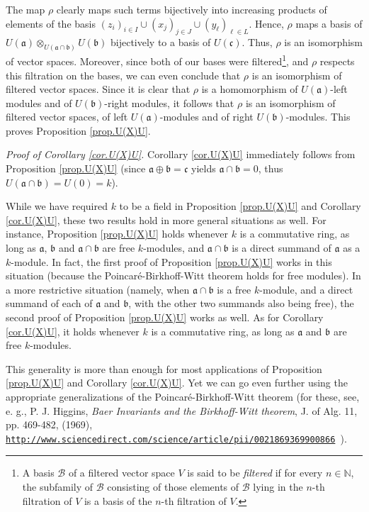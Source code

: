 \documentclass[etingof-lie.tex]{subfiles}
\begin{document}
The map $\rho$ clearly maps such terms bijectively into increasing products of
elements of the basis $\left(  z_{i}\right)  _{i\in I}\cup\left(
x_{j}\right)  _{j\in J}\cup\left(  y_{\ell}\right)  _{\ell\in L}$. Hence,
$\rho$ maps a basis of $U\left(  \mathfrak{a}\right)  \otimes_{U\left(
\mathfrak{a}\cap\mathfrak{b}\right)  }U\left(  \mathfrak{b}\right)  $
bijectively to a basis of $U\left(  \mathfrak{c}\right)  $. Thus, $\rho$ is an
isomorphism of vector spaces. Moreover, since both of our bases were
filtered\footnote{A basis $\mathcal{B}$ of a filtered vector space $V$ is said
to be \textit{filtered} if for every $n\in\mathbb{N}$, the subfamily of
$\mathcal{B}$ consisting of those elements of $\mathcal{B}$ lying in the
$n$-th filtration of $V$ is a basis of the $n$-th filtration of $V$.}, and
$\rho$ respects this filtration on the bases, we can even conclude that $\rho$
is an isomorphism of filtered vector spaces. Since it is clear that $\rho$ is
a homomorphism of $U\left(  \mathfrak{a}\right)  $-left modules and of
$U\left(  \mathfrak{b}\right)  $-right modules, it follows that $\rho$ is an
isomorphism of filtered vector spaces, of left $U\left(  \mathfrak{a}\right)
$-modules and of right $U\left(  \mathfrak{b}\right)  $-modules. This proves
Proposition \ref{prop.U(X)U}.

\textit{Proof of Corollary \ref{cor.U(X)U}.} Corollary \ref{cor.U(X)U}
immediately follows from Proposition \ref{prop.U(X)U} (since $\mathfrak{a}%
\oplus\mathfrak{b}=\mathfrak{c}$ yields $\mathfrak{a}\cap\mathfrak{b}=0$, thus
$U\left(  \mathfrak{a}\cap\mathfrak{b}\right)  =U\left(  0\right)  =k$).

\begin{remark}
\label{rmk.U(X)U}While we have required $k$ to be a field in Proposition
\ref{prop.U(X)U} and Corollary \ref{cor.U(X)U}, these two results hold in more
general situations as well. For instance, Proposition \ref{prop.U(X)U} holds
whenever $k$ is a commutative ring, as long as $\mathfrak{a}$, $\mathfrak{b}$
and $\mathfrak{a}\cap\mathfrak{b}$ are free $k$-modules, and $\mathfrak{a}%
\cap\mathfrak{b}$ is a direct summand of $\mathfrak{a}$ as a $k$-module. In
fact, the first proof of Proposition \ref{prop.U(X)U} works in this situation
(because the Poincar\'{e}-Birkhoff-Witt theorem holds for free modules). In a
more restrictive situation (namely, when $\mathfrak{a}\cap\mathfrak{b}$ is a
free $k$-module, and a direct summand of each of $\mathfrak{a}$ and
$\mathfrak{b}$, with the other two summands also being free), the second proof
of Proposition \ref{prop.U(X)U} works as well. As for Corollary
\ref{cor.U(X)U}, it holds whenever $k$ is a commutative ring, as long as
$\mathfrak{a}$ and $\mathfrak{b}$ are free $k$-modules.

This generality is more than enough for most applications of Proposition
\ref{prop.U(X)U} and Corollary \ref{cor.U(X)U}. Yet we can go even further
using the appropriate generalizations of the Poincar\'{e}-Birkhoff-Witt
theorem (for these, see, e. g., P. J. Higgins, \textit{Baer Invariants and the
Birkhoff-Witt theorem}, J. of Alg. 11, pp. 469-482, (1969), \newline%
\texttt{\url{http://www.sciencedirect.com/science/article/pii/0021869369900866}
}).
\end{remark}
\end{document}
